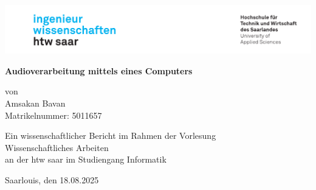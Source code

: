 \begin{titlepage}

\linespread{1.5}

\includegraphics[width=\linewidth]{graphics/htw_logo}

\begin{center}
    \large  
    \hfill
    \vfill
    \Large{\bfseries{Audioverarbeitung mittels eines Computers}}
    
    von \\
    Amsakan Bavan \\
    Matrikelnummer: 5011657

    \vfill
		
    Ein wissenschaftlicher Bericht im Rahmen der Vorlesung\\
    \glqq Wissenschaftliches Arbeiten\grqq\\
    an der htw saar im Studiengang Informatik\\
	
    \vfill	
    \vfill
	
    Saarlouis, den 18.08.2025
\end{center}
    
\end{titlepage}
